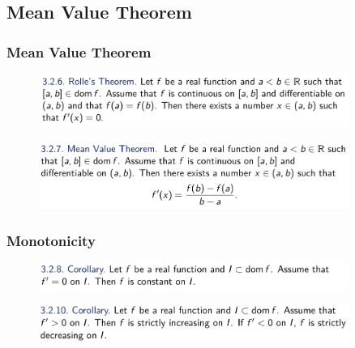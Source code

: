 \documentclass[10pt, t]{beamer}
\begin{document}
\subsection{Mean Value Theorem}
\begin{frame}
    \frametitle{Mean Value Theorem}

    \begin{figure}[H]
        \centering
        \includegraphics[width=0.9\textwidth]{2020-11-04-12-17-48.png}
    \end{figure}
    \begin{figure}[H]
        \centering
        \includegraphics[width=0.9\textwidth]{2020-11-04-12-18-05.png}
    \end{figure}
\end{frame}

\begin{frame}
    \frametitle{Monotonicity}

    \begin{figure}[H]
        \centering
        \includegraphics[width=0.9\textwidth]{2020-11-04-12-31-05.png}
    \end{figure}
    \begin{figure}[H]
        \centering
        \includegraphics[width=0.9\textwidth]{2020-11-04-12-31-21.png}
    \end{figure}
\end{frame}
\end{document}

